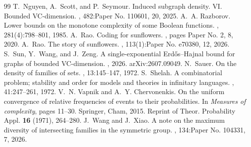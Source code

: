 \documentclass[10pt,a4paper]{amsart}
\begin{document}
\begin{thebibliography}{99}
 T.~Nguyen, A.~Scott, and P.~Seymour. \newblock Induced subgraph density. {VI}. {B}ounded {VC}-dimension. , 482:Paper No. 110601, 20, 2025.
 A.~A. Razborov. \newblock Lower bounds on the monotone complexity of some {B}oolean functions. , 281(4):798--801, 1985.
 A.~Rao. \newblock Coding for sunflowers. , pages Paper No. 2, 8, 2020.
 A.~Rao. \newblock The story of sunflowers. , 113(1):Paper No. e70380, 12, 2026.
 S.~Sun, Y.~Wang, and J.~Zeng. \newblock A single-exponential {Erd{\H{o}}s--Hajnal} bound for graphs of bounded {VC}-dimension. , 2026. \newblock arXiv:2607.09049.
 N.~Sauer. \newblock On the density of families of sets. , 13:145--147, 1972.
 S.~Shelah. \newblock A combinatorial problem; stability and order for models and theories in infinitary languages. , 41:247--261, 1972.
 V.~N. Vapnik and A.~Y. Chervonenkis. \newblock On the uniform convergence of relative frequencies of events to their probabilities. \newblock In {\em Measures of complexity}, pages 11--30. Springer, Cham, 2015. \newblock Reprint of Theor. Probability Appl. {\bf 16} (1971), 264--280.
 J.~Wang and J.~Xiao. \newblock A note on the maximum diversity of intersecting families in the symmetric group. , 134:Paper No. 104331, 7, 2026.
\end{thebibliography}
\end{document}
